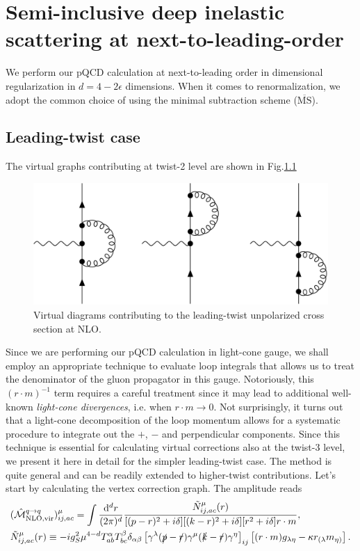 \chapter{Semi-inclusive deep inelastic scattering at next-to-leading-order}%

We perform our pQCD calculation at next-to-leading order in dimensional regularization in $d=4-2\epsilon$ dimensions. When it comes to renormalization, we adopt the common choice of using the minimal subtraction scheme ($\overline{\text{MS}}$).

\section{Leading-twist case}

The virtual graphs contributing at twist-2 level are shown in Fig.\ref{fig:Virt NLO tw2}
\begin{figure}
    \centering
    \includegraphics[width=0.55\linewidth]{fig/VirtNLOTw2.jpg}
    \caption{Virtual diagrams contributing to the leading-twist unpolarized cross section at NLO.}
    \label{fig:Virt NLO tw2}
\end{figure}
\noindent Since we are performing our pQCD calculation in light-cone gauge, we shall employ an appropriate technique to evaluate loop integrals that allows us to treat the denominator of the gluon propagator in this gauge. Notoriously, this $(r \cdot m)^{-1}$ term requires a careful treatment since it may lead to additional well-known \textit{light-cone divergences}, i.e. when $r \cdot m \to 0$. Not surprisingly, it turns out that a light-cone decomposition of the loop momentum allows for a systematic procedure to integrate out the $+$, $-$ and perpendicular components. Since this technique is essential for calculating virtual corrections also at the twist-3 level, we present it here in detail for the simpler leading-twist case. The method is quite general and can be readily extended to higher-twist contributions. Let's start by calculating the vertex correction graph. The amplitude reads
\begin{equation}\label{eq:amplitudevirtualtwist2}
\begin{aligned}
     &(\hat{\mathcal{M}}^{q \to q}_{\text{NLO,vir}})^\mu_{ij,ac} = \int\frac{\dd ^dr}{(2\pi)^d}\frac{\tilde N^\mu_{ij,ac}(r)}{[(p-r)^2+i\delta][(k-r)^2+i\delta][r^2+i\delta]r \cdot m},\\
       & \tilde N^\mu_{ij,ac}(r) \equiv -ig_S^2\mu^{4-d}T^\alpha_{ab} T^\beta_{bc}\delta_{\alpha\beta}\left[\gamma^\lambda(\slashed{p}-\slashed{r})\gamma^\mu(\slashed{k}-\slashed{r})\gamma^\eta\right]_{ij}\left[(r\cdot m)g_{\lambda\eta}-\kappa r_{(\lambda} m_{\eta)}\right].
    \end{aligned}
\end{equation}
